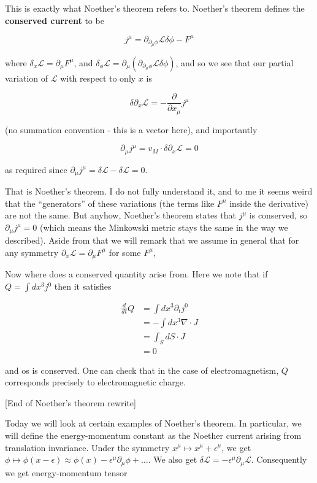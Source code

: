 \documentclass{article}
\theoremstyle{definition}
\begin{document}
This is exactly what Noether's theorem refers to. Noether's theorem defines the
\textbf{conserved current} to be

$$ j^\mu = \partial_{\partial_\mu \phi} \mathcal{L} \delta \phi - F^\mu $$

where $\delta_x \mathcal{L} = \partial_\mu F^\mu$, and $\delta_\phi \mathcal{L}
= \partial_\mu (\partial_{\partial_\mu \phi} \mathcal{L} \delta \phi) $, and so
we see that our partial variation of $\mathcal{L}$ with respect to only $x$ is

$$ \delta \partial_x \mathcal{L} = -\frac{\partial}{\partial x_\mu} j^\mu $$

(no summation convention - this is a vector here), and importantly

$$ \partial_\mu j^\mu = v_M \cdot \delta \partial_x \mathcal{L} = 0 $$

as required since $\partial_\mu j^\mu = \delta \mathcal{L} - \delta \mathcal{L}
= 0$.

That is Noether's theorem. I do not fully understand it, and to me it seems
weird that the ``generators'' of these variations (the terms like $F^\mu$ inside
the derivative) are not the same. But anyhow, Noether's theorem states that
$j^\mu$ is conserved, so $\partial_\mu j^\mu = 0$ (which means the Minkowski
metric stays the same in the way we described). Aside from that we will remark
that we assume in general that for any symmetry $\partial_x \mathcal{L} =
\partial_\mu F^\mu$ for some $F^\mu$,

Now where does a conserved quantity arise from. Here we note that if $Q = \int
dx^3 j^0$ then it satisfies

\begin{align*}
  \frac{d}{dt} Q
  &= \int dx^3 \partial_t j^0 \\
  &= - \int dx^3 \nabla \cdot J \\
  &= \int_S dS \cdot J \\
  &= 0
\end{align*}

and os is conserved. One can check that in the case of electromagnetism, $Q$
corresponds precisely to electromagnetic charge.

[End of Noether's theorem rewrite]

Today we will look at certain examples of Noether's theorem. In particular, we
will define the energy-momentum constant as the Noether current arising from
translation invariance. Under the symmetry $x^\mu \mapsto x^\mu + \epsilon^\mu$,
we get $\phi \mapsto \phi(x - \epsilon) \approx \phi(x) - \epsilon^\mu
\partial_\mu \phi + \dots$. We also get $\delta \mathcal{L} = -\epsilon^\mu
\partial_\mu \mathcal{L}$. Consequently we get energy-momentum tensor
\end{document}
